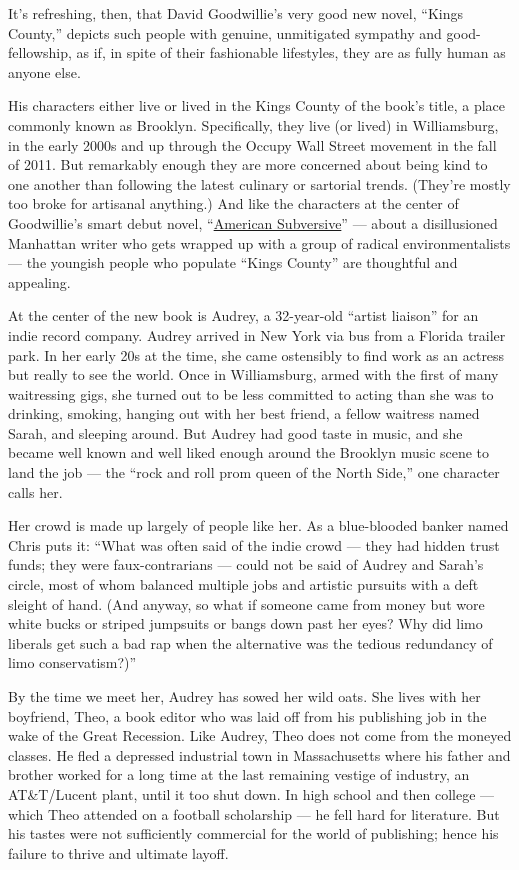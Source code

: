 It's refreshing, then, that David Goodwillie's very good new novel,
``Kings County,'' depicts such people with genuine, unmitigated sympathy
and good-fellowship, as if, in spite of their fashionable lifestyles,
they are as fully human as anyone else.

His characters either live or lived in the Kings County of the book's
title, a place commonly known as Brooklyn. Specifically, they live (or
lived) in Williamsburg, in the early 2000s and up through the Occupy
Wall Street movement in the fall of 2011. But remarkably enough they are
more concerned about being kind to one another than following the latest
culinary or sartorial trends. (They're mostly too broke for artisanal
anything.) And like the characters at the center of Goodwillie's smart
debut novel,
``\href{https://www.nytimes3xbfgragh.onion/2010/05/09/books/review/Watrous-t.html}{American
Subversive}'' --- about a disillusioned Manhattan writer who gets
wrapped up with a group of radical environmentalists --- the youngish
people who populate ``Kings County'' are thoughtful and appealing.

At the center of the new book is Audrey, a 32-year-old ``artist
liaison'' for an indie record company. Audrey arrived in New York via
bus from a Florida trailer park. In her early 20s at the time, she came
ostensibly to find work as an actress but really to see the world. Once
in Williamsburg, armed with the first of many waitressing gigs, she
turned out to be less committed to acting than she was to drinking,
smoking, hanging out with her best friend, a fellow waitress named
Sarah, and sleeping around. But Audrey had good taste in music, and she
became well known and well liked enough around the Brooklyn music scene
to land the job --- the ``rock and roll prom queen of the North Side,''
one character calls her.

Her crowd is made up largely of people like her. As a blue-blooded
banker named Chris puts it: ``What was often said of the indie crowd ---
they had hidden trust funds; they were faux-contrarians --- could not be
said of Audrey and Sarah's circle, most of whom balanced multiple jobs
and artistic pursuits with a deft sleight of hand. (And anyway, so what
if someone came from money but wore white bucks or striped jumpsuits or
bangs down past her eyes? Why did limo liberals get such a bad rap when
the alternative was the tedious redundancy of limo conservatism?)''

By the time we meet her, Audrey has sowed her wild oats. She lives with
her boyfriend, Theo, a book editor who was laid off from his publishing
job in the wake of the Great Recession. Like Audrey, Theo does not come
from the moneyed classes. He fled a depressed industrial town in
Massachusetts where his father and brother worked for a long time at the
last remaining vestige of industry, an AT\&T/Lucent plant, until it too
shut down. In high school and then college --- which Theo attended on a
football scholarship --- he fell hard for literature. But his tastes
were not sufficiently commercial for the world of publishing; hence his
failure to thrive and ultimate layoff.

